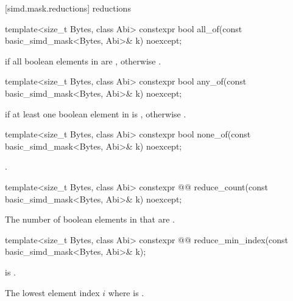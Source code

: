 [simd.mask.reductions]{ reductions}

\begin{itemdecl}
template<size_t Bytes, class Abi>
  constexpr bool all_of(const basic_simd_mask<Bytes, Abi>& k) noexcept;
\end{itemdecl}

\begin{itemdescr}
\pnum
\returns
{} if all boolean elements in  are , otherwise
.
\end{itemdescr}

\begin{itemdecl}
template<size_t Bytes, class Abi>
  constexpr bool any_of(const basic_simd_mask<Bytes, Abi>& k) noexcept;
\end{itemdecl}

\begin{itemdescr}
\pnum
\returns
{} if at least one boolean element in  is ,
otherwise .
\end{itemdescr}

\begin{itemdecl}
template<size_t Bytes, class Abi>
  constexpr bool none_of(const basic_simd_mask<Bytes, Abi>& k) noexcept;
\end{itemdecl}

\begin{itemdescr}
\pnum
\returns
{}.
\end{itemdescr}

\begin{itemdecl}
template<size_t Bytes, class Abi>
  constexpr @@ reduce_count(const basic_simd_mask<Bytes, Abi>& k) noexcept;
\end{itemdecl}

\begin{itemdescr}
\pnum
\returns
The number of boolean elements in  that are .
\end{itemdescr}

\begin{itemdecl}
template<size_t Bytes, class Abi>
  constexpr @@ reduce_min_index(const basic_simd_mask<Bytes, Abi>& k);
\end{itemdecl}

\begin{itemdescr}
\pnum
\expects
{} is .

\pnum
\returns
The lowest element index $i$ where  is .
\end{itemdescr}

